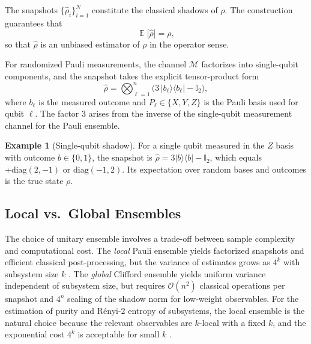 \documentclass[12pt,a4paper,oneside]{book}
\theoremstyle{plain}
\theoremstyle{definition}
\newtheorem{example}[theorem]{Example}
\theoremstyle{remark}
\DeclareMathOperator{\E}{\mathbb{E}}
\begin{document}
The snapshots $\{\hat{\rho}_i\}_{i=1}^{N}$ constitute the classical shadows of $\rho$. The construction guarantees that
\begin{equation}
    \E\bigl[\hat{\rho}\bigr] = \rho,
\end{equation}
so that $\hat{\rho}$ is an unbiased estimator of $\rho$ in the operator sense.

For randomized Pauli measurements, the channel $\mathcal{M}$ factorizes into single-qubit components, and the snapshot takes the explicit tensor-product form \cite{huang2020predicting}
\begin{equation}
    \label{eq:snapshot_pauli}
    \hat{\rho} = \bigotimes_{\ell=1}^{n} \bigl(3\,|b_\ell\rangle\langle b_\ell| - \mathbb{I}_2\bigr),
\end{equation}
where $b_\ell$ is the measured outcome and $P_\ell \in \{X, Y, Z\}$ is the Pauli basis used for qubit $\ell$. The factor $3$ arises from the inverse of the single-qubit measurement channel for the Pauli ensemble.

\begin{example}[Single-qubit shadow]
For a single qubit measured in the $Z$ basis with outcome $b \in \{0,1\}$, the snapshot is $\hat{\rho} = 3|b\rangle\langle b| - \mathbb{I}_2$, which equals $+\text{diag}(2,-1)$ or $\text{diag}(-1,2)$. Its expectation over random bases and outcomes is the true state $\rho$.
\end{example}

\subsection{Local vs.\ Global Ensembles}

The choice of unitary ensemble involves a trade-off between sample complexity and computational cost. The \emph{local} Pauli ensemble yields factorized snapshots and efficient classical post-processing, but the variance of estimates grows as $4^k$ with subsystem size $k$ \cite{huang2020predicting}. The \emph{global} Clifford ensemble yields uniform variance independent of subsystem size, but requires $\mathcal{O}(n^2)$ classical operations per snapshot and $4^n$ scaling of the shadow norm for low-weight observables. For the estimation of purity and R\'enyi-2 entropy of subsystems, the local ensemble is the natural choice because the relevant observables are $k$-local with a fixed $k$, and the exponential cost $4^k$ is acceptable for small $k$ \cite{elben2020cross, brydges2019probing}.

\end{document}
